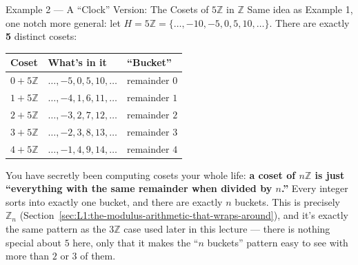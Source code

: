 \begin{exbox}{Example 2 --- A ``Clock'' Version: The Cosets of $5\mathbb{Z}$ in $\mathbb{Z}$}
Same idea as Example 1, one notch more general: let $H = 5\mathbb{Z} = \{\ldots,-10,-5,0,5,10,\ldots\}$. There are exactly \textbf{5} distinct cosets:
\begin{center}
\begin{tabular}{|l|l|l|}
\hline
\textbf{Coset} & \textbf{What's in it} & \textbf{``Bucket''} \\
\hline
$0+5\mathbb{Z}$ & $\ldots,-5,0,5,10,\ldots$ & remainder $0$ \\
$1+5\mathbb{Z}$ & $\ldots,-4,1,6,11,\ldots$ & remainder $1$ \\
$2+5\mathbb{Z}$ & $\ldots,-3,2,7,12,\ldots$ & remainder $2$ \\
$3+5\mathbb{Z}$ & $\ldots,-2,3,8,13,\ldots$ & remainder $3$ \\
$4+5\mathbb{Z}$ & $\ldots,-1,4,9,14,\ldots$ & remainder $4$ \\
\hline
\end{tabular}
\end{center}
You have secretly been computing cosets your whole life: \textbf{a coset of $n\mathbb{Z}$ is just ``everything with the same remainder when divided by $n$.''} Every integer sorts into exactly one bucket, and there are exactly $n$ buckets. This is precisely $\mathbb{Z}_n$ (Section~\ref{sec:L1:the-modulus-arithmetic-that-wraps-around}), and it's exactly the same pattern as the $3\mathbb{Z}$ case used later in this lecture --- there is nothing special about $5$ here, only that it makes the ``$n$ buckets'' pattern easy to see with more than $2$ or $3$ of them.
\end{exbox}

